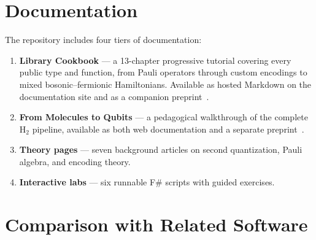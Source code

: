 \documentclass[10pt,a4paper]{article}
\begin{document}
\section*{Documentation}

The repository includes four tiers of documentation:

\begin{enumerate}
  \item \textbf{Library Cookbook} — a 13-chapter progressive tutorial
    covering every public type and function, from Pauli operators
    through custom encodings to mixed bosonic--fermionic Hamiltonians.
    Available as hosted Markdown on the documentation site and as a
    companion preprint~\cite{cookbook2026}.
  \item \textbf{From Molecules to Qubits} — a pedagogical walkthrough
    of the complete H$_2$ pipeline, available as both web documentation
    and a separate preprint~\cite{tutorial2026}.
  \item \textbf{Theory pages} — seven background articles on second
    quantization, Pauli algebra, and encoding theory.
  \item \textbf{Interactive labs} — six runnable F\# scripts with
    guided exercises.
\end{enumerate}

\section*{Comparison with Related Software}
\end{document}
